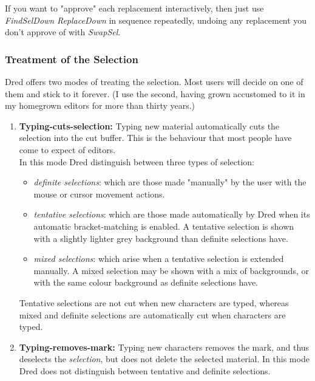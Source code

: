 \documentclass[
]{article}
\providecommand{\tightlist}{%
  \setlength{\itemsep}{0pt}\setlength{\parskip}{0pt}}
\begin{document}
If you want to "approve" each replacement interactively, then just use
\emph{FindSelDown} \emph{ReplaceDown} in sequence repeatedly, undoing
any replacement you don't approve of with \emph{SwapSel}.

\hypertarget{treatment-of-the-selection}{%
\subsubsection{Treatment of the
Selection}\label{treatment-of-the-selection}}

Dred offers two modes of treating the selection. Most users will decide
on one of them and stick to it forever. (I use the second, having grown
accustomed to it in my homegrown editors for more than thirty years.)

\begin{enumerate}
\def\labelenumi{\arabic{enumi}.}
\tightlist
\item
  \textbf{Typing-cuts-selection:} Typing new material automatically cuts
  the selection into the cut buffer. This is the behaviour that most
  people have come to expect of editors.\\
  In this mode Dred distinguish between three types of selection:

  \begin{itemize}
  \tightlist
  \item
    \emph{definite selections}: which are those made "manually" by the
    user with the mouse or cursor movement actions.
  \item
    \emph{tentative selections}: which are those made automatically by
    Dred when its automatic bracket-matching is enabled. A tentative
    selection is shown with a slightly lighter grey background than
    definite selections have.
  \item
    \emph{mixed selections}: which arise when a tentative selection is
    extended manually. A mixed selection may be shown with a mix of
    backgrounds, or with the same colour background as definite
    selections have.
  \end{itemize}

  \hfill\break
  Tentative selections are not cut when new characters are typed,
  whereas mixed and definite selections are automatically cut when
  characters are typed.
\item
  \textbf{Typing-removes-mark:} Typing new characters removes the mark,
  and thus deselects the \emph{selection}, but does not delete the
  selected material. In this mode Dred does not distinguish between
  tentative and definite selections.
\end{enumerate}
\end{document}
